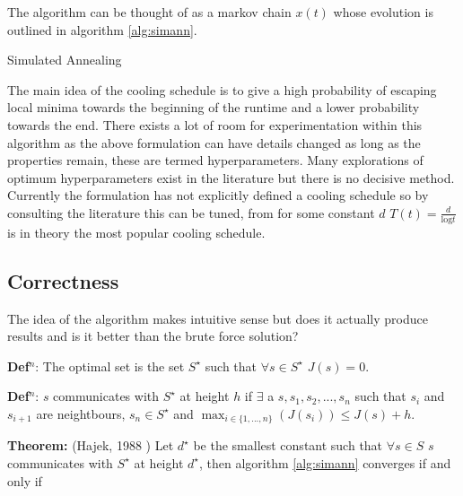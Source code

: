 \documentclass[a4paper,11pt]{report}
\begin{document}
{The algorithm can be thought of as a markov chain $x(t)$ \cite{simulatedannealing} whose evolution is outlined in algorithm \ref{alg:simann}.

\begin{algorithm}[!h]
\caption{Simulated Annealing\label{alg:simann}\cite{kirkpatrick1983optimization}}
\begin{algorithmic}
		\Else
			\Else{ }
			\EndIf
		\EndIf
	\EndFor
\EndProcedure
\end{algorithmic}
\end{algorithm}

The main idea of the cooling schedule is to give a high probability of escaping local minima towards the beginning of the runtime and a lower probability towards the end. There exists a lot of room for experimentation within this algorithm as the above formulation can have details changed as long as the properties remain, these are termed hyperparameters. Many explorations of optimum hyperparameters exist in the literature but there is no decisive method. Currently the formulation has not explicitly defined a cooling schedule so by consulting the literature this can be tuned, from \cite{kirkpatrick1983optimization} for some constant $d$ $T(t)=\frac{d}{\text{log}t}$ is in theory the most popular cooling schedule. 

\subsection{Correctness}
The idea of the algorithm makes intuitive sense but does it actually produce results and is it better than the brute force solution?

\textbf{Def$^n$}: The optimal set is the set $S^\star$ such that $\forall s \in S^\star$ $J(s)=0$. 

\textbf{Def$^n$}: $s$ communicates with $S^\star$ at height $h$ if $\exists$ a $s,s_1,s_2,...,s_n$ such that $s_i$ and $s_{i+1}$ are neightbours, $s_n\in S^\star$ and $\max_{i\in\{1,...,n\}}(J(s_i))\leq J(s)+h$. 

\textbf{Theorem:} (Hajek, 1988 \cite{}) Let $d^\star$ be the smallest constant such that $\forall s\in S$ $s$ communicates with $S^\star$ at height $d^\star$, then algorithm \ref{alg:simann} converges if and only if 

}
\end{document}
